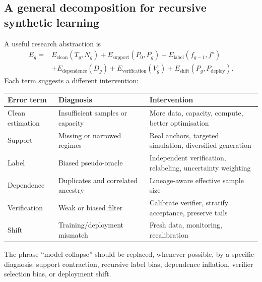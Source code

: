 \subsection{A general decomposition for recursive synthetic learning}

A useful research abstraction is
\[
\begin{aligned}
E_g ={}& E_{\mathrm{clean}}(T_g,N_g)
+E_{\mathrm{support}}(P_0,P_g)
+E_{\mathrm{label}}(f_{g-1},f^\star)\\
&+E_{\mathrm{dependence}}(D_g)
+E_{\mathrm{verification}}(V_g)
+E_{\mathrm{shift}}(P_g,P_{\mathrm{deploy}}).
\end{aligned}
\]
Each term suggests a different intervention:

\begin{longtable}{p{}p{}p{}}
\toprule
\textbf{Error term} & \textbf{Diagnosis} & \textbf{Intervention} \\
\midrule
Clean estimation & Insufficient samples or capacity & More data, capacity, compute, better optimisation \\
Support & Missing or narrowed regimes & Real anchors, targeted simulation, diversified generation \\
Label & Biased pseudo-oracle & Independent verification, relabeling, uncertainty weighting \\
Dependence & Duplicates and correlated ancestry & Lineage-aware effective sample size \\
Verification & Weak or biased filter & Calibrate verifier, stratify acceptance, preserve tails \\
Shift & Training/deployment mismatch & Fresh data, monitoring, recalibration \\
\bottomrule
\end{longtable}

\begin{keyidea}
The phrase ``model collapse'' should be replaced, whenever possible, by a specific diagnosis: support contraction, recursive label bias, dependence inflation, verifier selection bias, or deployment shift.
\end{keyidea}
